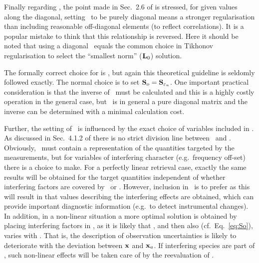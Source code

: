 Finally regarding , the point made in Sec.~2.6 of \citet{rodgers:00}
is stressed, for given values along the diagonal, setting \ to be
purely diagonal means a stronger regularisation than including reasonable
off-diagonal elements (to reflect correlations). It is a popular mistake to
think that this relationship is reversed. Here it should be noted that using a
diagonal \ equals the common choice in Tikhonov regularisation to
select the ``smallest norm'' ($\mathbf{L}_0$) solution.

The formally correct choice for  is 
\citep{eriksson:analy:00,rodgers:00}, but again this theoretical guideline is
seldomly followed exactly. The normal choice is to set
$\mathbf{S}_{o}=\mathbf{S}_{\varepsilon_n}$. One important practical consideration is
that the inverse of \ must be calculated and this is a
highly costly operation in the general case, but \ is in
general a pure diagonal matrix and the inverse can be determined with a minimal
calculation cost. 

Further, the setting of \ is influenced by the exact choice of
variables included in \SttVct. As discussed in Sec.~4.1.2 of \citet{rodgers:00}
there is no strict division line between \SttVct\ and \FrwMdlVct. Obviously,
\SttVct\ must contain a representation of the quantities targeted by the
measurements, but for variables of interfering character (e.g.\ frequency
off-set) there is a choice to make. For a perfectly linear retrieval case, exactly
the same results will be obtained for the target quantities independent of whether
interfering factors are covered by \SttVct\ or \FrwMdlVct. However, inclusion
in \SttVct\ is to prefer as this will result in that values describing the
interfering effects are obtained, which can provide important diagnostic
information (e.g.\ to detect instrumental changes). In addition, in a
non-linear situation a more optimal solution is obtained by placing interfering
factors in \SttVct, as it is likely that \aWfnMtr{\FrwMdlVct}, and then also
 (cf.\ Eq.~\ref{eq:So}), varies with \SttVct. That is,
the description of observation uncertainties is likely to deteriorate with
the deviation between $\mathbf{x}$ and $\mathbf{x}_{a}$. If interfering species are part
of \SttVct, such non-linear effects will be taken care of by the reevaluation of 
\aWfnMtr{\SttVct}.


